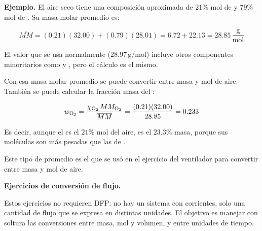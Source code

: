 \textbf{Ejemplo.} El aire seco tiene una composición aproximada de
$21\%$ mol de  y $79\%$ mol de . Su masa molar
promedio es:

\[
\overline{MM} = (0.21)(32.00) + (0.79)(28.01)
= 6.72 + 22.13 = 28.85\,\frac{\mathrm{g}}{\mathrm{mol}}
\]

El valor que se usa normalmente ($28.97\,\mathrm{g/mol}$) incluye
otros componentes minoritarios como  y , pero el
cálculo es el mismo.

Con esa masa molar promedio se puede convertir entre masa y mol de
aire. También se puede calcular la fracción masa del :

\[
w_{\ce{O2}} = \frac{\chi_{\ce{O2}} \, MM_{\ce{O2}}}{\overline{MM}}
= \frac{(0.21)(32.00)}{28.85} = 0.233
\]

Es decir, aunque el  es el $21\%$ mol del aire, es el $23.3\%$
masa, porque sus moléculas son más pesadas que las de .

Este tipo de promedio es el que se usó en el ejercicio del ventilador
para convertir entre masa y mol de aire.

\textbf{Ejercicios de conversión de flujo.}

Estos ejercicios no requieren DFP: no hay un sistema con corrientes,
solo una cantidad de flujo que se expresa en distintas unidades. El
objetivo es manejar con soltura las conversiones entre masa, mol y
volumen, y entre unidades de tiempo.

